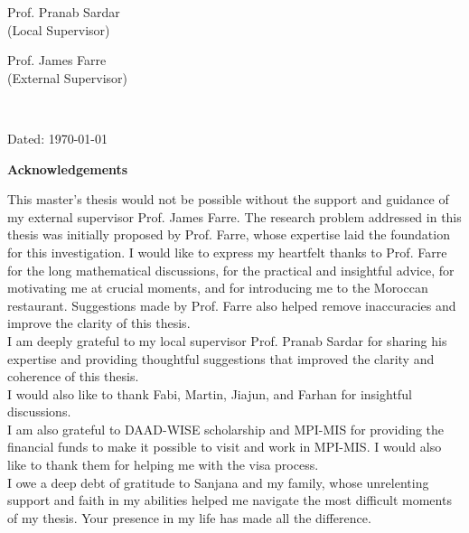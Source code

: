 \documentclass[a4paper, 12pt, twoside]{report}
\theoremstyle{plain}
\theoremstyle{definition}
\theoremstyle{remark}
\begin{document}
\vspace{2cm}
  \begin{minipage}{3.75cm}
    Prof. Pranab Sardar
    \\
    (Local Supervisor)
  \end{minipage}
  \hfill
  \begin{minipage}{3.90cm}
    Prof. James Farre
    \\
    (External Supervisor)
  \end{minipage}\\
\vspace{2cm}
\begin{flushright}
Dated: \today
\end{flushright}

\cleardoublepage

\begin{center}
\textbf{\Large Acknowledgements}
\end{center}

This master's thesis would not be possible without the support and guidance of my external supervisor Prof. James Farre. The research problem addressed in this thesis was initially proposed by Prof. Farre, whose expertise laid the foundation for this investigation. I would like to express my heartfelt thanks to Prof. Farre for the long mathematical discussions, for the practical and insightful advice, for motivating me at crucial moments, and for introducing me to the Moroccan restaurant. Suggestions made by Prof. Farre also helped remove inaccuracies and improve the clarity of this thesis.\\

I am deeply grateful to my local supervisor Prof. Pranab Sardar for sharing his expertise and providing thoughtful suggestions that improved the clarity and coherence of this thesis.\\

I would also like to thank Fabi, Martin, Jiajun, and Farhan for insightful discussions.\\

I am also grateful to DAAD-WISE scholarship and MPI-MIS for providing the financial funds to make it possible to visit and work in MPI-MIS. I would also like to thank them for helping me with the visa process.\\

I owe a deep debt of gratitude to Sanjana and my family, whose unrelenting support and faith in my abilities helped me navigate the most difficult moments of my thesis. Your presence in my life has made all the difference.
\end{document}

